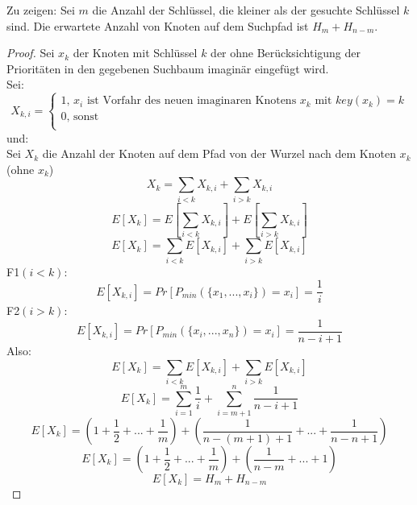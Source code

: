 \documentclass{article}
\begin{document}
 Zu zeigen: Sei $m$ die Anzahl der Schlüssel, die kleiner als der gesuchte Schlüssel $k$ sind. Die erwartete Anzahl von Knoten auf dem Suchpfad ist $H_{m}+H_{n-m}$. 
\begin{proof}
\noindent

Sei $x_{k}$ der Knoten mit Schlüssel $k$ der ohne Berücksichtigung der Prioritäten in den gegebenen Suchbaum imaginär eingefügt wird.\\

Sei:\\
  \[
    X_{k,i}=\left\{
                \begin{array}{ll}
                  1\text{, } x_{i} \text{ ist Vorfahr des neuen imaginaren Knotens } x_{k} \text{ mit } key(x_{k})=k\\
                  0 \text{, sonst}\\
                
                \end{array}
              \right.
  \]
und:\\
Sei $X_{k}$ die Anzahl der Knoten auf dem Pfad von der Wurzel nach dem Knoten $x_{k}$ (ohne $x_{k}$)
\begin{equation}
X_{k}=\sum_{i<k} X_{k,i} +\sum_{i>k} X_{k,i}
\end{equation}
\begin{equation}
E[X_{k}]=E[\sum_{i<k} X_{k,i}] +E[\sum_{i>k} X_{k,i}]
\end{equation}
\begin{equation}
E[X_{k}]=\sum_{i<k} E[X_{k,i}] +\sum_{i>k} E[X_{k,i}]
\end{equation}
F1$(i<k)$:\\
\begin{equation}
E[X_{k,i}]=Pr[P_{min}(\lbrace x_{1},...,x_{i}\rbrace)=x_{i}]=\frac{1}{i}
\end{equation}
F2$(i>k)$:\\
\begin{equation}
E[X_{k,i}]=Pr[P_{min}(\lbrace x_{i},...,x_{n}\rbrace)=x_{i}]=\frac{1}{n-i+1}
\end{equation}
Also:\\
\begin{equation}
E[X_{k}]=\sum_{i<k} E[X_{k,i}] +\sum_{i>k} E[X_{k,i}]
\end{equation}
\begin{equation}
E[X_{k}]=\sum_{i=1}^{m} \frac{1}{i} +\sum_{i=m+1}^{n} \frac{1}{n-i+1}
\end{equation}
\begin{equation}
E[X_{k}]=(1+\frac{1}{2}+...+\frac{1}{m})+(\frac{1}{n-(m+1)+1}+...+\frac{1}{n-n+1})
\end{equation}
\begin{equation}
E[X_{k}]=(1+\frac{1}{2}+...+\frac{1}{m})+(\frac{1}{n-m}+...+1)
\end{equation}
\begin{equation}
E[X_{k}]=H_{m}+H_{n-m}
\end{equation}
\end{proof}
\end{document}
